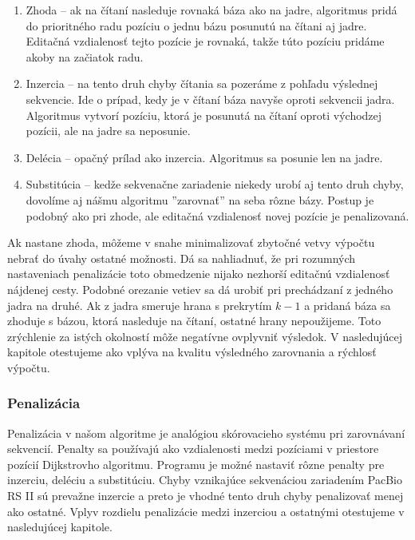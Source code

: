 \begin{enumerate}[label={R.\arabic*}]
\item \label{item:zhoda}        Zhoda -- ak na čítaní nasleduje rovnaká báza ako na jadre, algoritmus pridá do prioritného radu pozíciu o jednu bázu posunutú na čítani aj jadre. Editačná vzdialenosť tejto pozície je rovnaká, takže túto pozíciu pridáme akoby na začiatok radu.
\item \label{item:inzercia}     Inzercia -- na tento druh chyby čítania sa pozeráme z pohľadu výslednej sekvencie. Ide o prípad, kedy je v čítaní báza navyše oproti sekvencii jadra. Algoritmus vytvorí pozíciu, ktorá je posunutá na čítaní oproti východzej pozícii, ale na jadre sa neposunie. 
\item \label{item:delecia}      Delécia -- opačný prílad ako inzercia. Algoritmus sa posunie len na jadre.
\item \label{item:substitucia}  Substitúcia -- kedže sekvenačne zariadenie niekedy urobí aj tento druh chyby, dovolíme aj nášmu algoritmu ''zarovnať'' na seba rôzne bázy. Postup je podobný ako pri zhode, ale editačná vzdialenosť novej pozície je penalizovaná.
\end{enumerate}

Ak nastane zhoda, môžeme v snahe minimalizovať zbytočné vetvy výpočtu nebrať do úvahy ostatné možnosti. Dá sa nahliadnuť, že pri rozumných nastaveniach penalizácie toto obmedzenie nijako nezhorší editačnú vzdialenosť nájdenej cesty. Podobné orezanie vetiev sa dá urobiť pri prechádzaní z jedného jadra na druhé. Ak z jadra smeruje hrana s prekrytím $k - 1$ a pridaná báza sa zhoduje s bázou, ktorá nasleduje na čítaní, ostatné hrany nepoužijeme. Toto zrýchlenie za istých okolností môže negatívne ovplyvniť výsledok. V nasledujúcej kapitole otestujeme ako vplýva na kvalitu výsledného zarovnania a rýchlosť výpočtu.

\subsubsection{Penalizácia}

Penalizácia v našom algoritme je analógiou skórovacieho systému pri zarovnávaní sekvencií. Penalty sa používajú ako vzdialenosti medzi pozíciami v priestore pozícií Dijkstrovho algoritmu. Programu je možné nastaviť rôzne penalty pre inzerciu, deléciu a substitúciu. Chyby vznikajúce sekvenáciou zariadením PacBio RS II sú prevažne inzercie a preto je vhodné tento druh chyby penalizovať menej ako ostatné. Vplyv rozdielu penalizácie medzi inzerciou a ostatnými otestujeme v nasledujúcej kapitole. 

